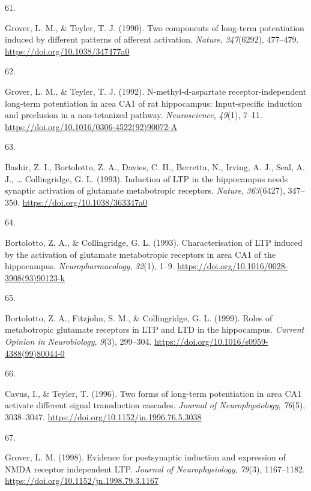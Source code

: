 \documentclass[
  11pt,
  letterpaper,
]{scrreprt}
\newlength{\cslhangindent}
\newlength{\csllabelwidth}
\newenvironment{CSLReferences}[2] %
 {\begin{list}{}{%
  \setlength{\itemindent}{0pt}
  \setlength{\leftmargin}{0pt}
  \setlength{\parsep}{0pt}
  \ifodd #1
   \setlength{\leftmargin}{\cslhangindent}
   \setlength{\itemindent}{-1\cslhangindent}
  \fi
  \setlength{\itemsep}{#2\baselineskip}}}
 {\end{list}}
\newcommand{\CSLLeftMargin}[1]{\parbox[t]{\csllabelwidth}{\strut#1\strut}}
\newcommand{\CSLRightInline}[1]{\parbox[t]{\linewidth - \csllabelwidth}{\strut#1\strut}}
\begin{document}
\begin{CSLReferences}{0}{0}
\CSLLeftMargin{61. }%
\CSLRightInline{Grover, L. M., \& Teyler, T. J. (1990). Two components
of long-term potentiation induced by different patterns of afferent
activation. \emph{Nature}, \emph{347}(6292), 477--479.
\url{https://doi.org/10.1038/347477a0}}

\CSLLeftMargin{62. }%
\CSLRightInline{Grover, L. M., \& Teyler, T. J. (1992).
N-methyl-d-aspartate receptor-independent long-term potentiation in area
{CA1} of rat hippocampus: {Input-specific} induction and preclusion in a
non-tetanized pathway. \emph{Neuroscience}, \emph{49}(1), 7--11.
\url{https://doi.org/10.1016/0306-4522(92)90072-A}}

\CSLLeftMargin{63. }%
\CSLRightInline{Bashir, Z. I., Bortolotto, Z. A., Davies, C. H.,
Berretta, N., Irving, A. J., Seal, A. J., \ldots{} Collingridge, G. L.
(1993). Induction of {LTP} in the hippocampus needs synaptic activation
of glutamate metabotropic receptors. \emph{Nature}, \emph{363}(6427),
347--350. \url{https://doi.org/10.1038/363347a0}}

\CSLLeftMargin{64. }%
\CSLRightInline{Bortolotto, Z. A., \& Collingridge, G. L. (1993).
Characterisation of {LTP} induced by the activation of glutamate
metabotropic receptors in area {CA1} of the hippocampus.
\emph{Neuropharmacology}, \emph{32}(1), 1--9.
\url{https://doi.org/10.1016/0028-3908(93)90123-k}}

\CSLLeftMargin{65. }%
\CSLRightInline{Bortolotto, Z. A., Fitzjohn, S. M., \& Collingridge, G.
L. (1999). Roles of metabotropic glutamate receptors in {LTP} and {LTD}
in the hippocampus. \emph{Current Opinion in Neurobiology}, \emph{9}(3),
299--304. \url{https://doi.org/10.1016/s0959-4388(99)80044-0}}

\CSLLeftMargin{66. }%
\CSLRightInline{Cavus, I., \& Teyler, T. (1996). Two forms of long-term
potentiation in area {CA1} activate different signal transduction
cascades. \emph{Journal of Neurophysiology}, \emph{76}(5), 3038--3047.
\url{https://doi.org/10.1152/jn.1996.76.5.3038}}

\CSLLeftMargin{67. }%
\CSLRightInline{Grover, L. M. (1998). Evidence for postsynaptic
induction and expression of {NMDA} receptor independent {LTP}.
\emph{Journal of Neurophysiology}, \emph{79}(3), 1167--1182.
\url{https://doi.org/10.1152/jn.1998.79.3.1167}}


\end{CSLReferences}
\end{document}
